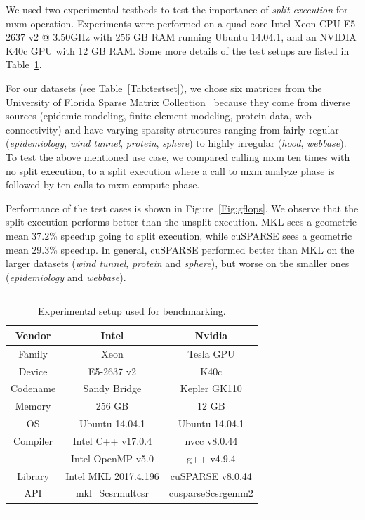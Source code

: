 We used two experimental testbeds to test the importance of \emph{split
execution} for {\sf mxm} operation. Experiments were performed on a
quad-core Intel Xeon CPU E5-2637 v2 @ 3.50GHz with 256 GB RAM running
Ubuntu 14.04.1, and an NVIDIA K40c GPU with 12 GB RAM. Some more details
of the test setups are listed in Table~\ref{Tab:testbed}.

For our datasets (see Table~\ref{Tab:testset}), we chose
six matrices from the University of Florida Sparse Matrix
Collection~\cite{davis2011university} because they come from diverse
sources (epidemic modeling, finite element modeling, protein data,
web connectivity) and have varying sparsity structures ranging from
fairly regular (\emph{epidemiology}, \emph{wind tunnel}, \emph{protein},
\emph{sphere}) to highly irregular (\emph{hood}, \emph{webbase}). To
test the above mentioned use case, we compared calling {\sf mxm} ten
times with no split execution, to a split execution where a call to {\sf
mxm} analyze phase is followed by ten calls to {\sf mxm} compute phase.

Performance of the test cases is shown in Figure~\ref{Fig:gflops}. We observe that the split
execution performs better than the unsplit execution. MKL sees a geometric mean
37.2\% speedup going to split execution, while cuSPARSE sees a geometric mean
29.3\% speedup. In general, cuSPARSE performed better than MKL on the
larger datasets (\emph{wind tunnel}, \emph{protein} and \emph{sphere}),
but worse on the smaller ones (\emph{epidemiology} and \emph{webbase}).

\begin{table}[htb]
	\hrule
	\caption{Experimental setup used for benchmarking.}
	\label{Tab:testbed}
	\begin{center}
		\begin{tabular}{|c|c|c|} \hline
			Vendor & Intel & Nvidia \\ \hline
			Family & Xeon & Tesla GPU \\
			Device & E5-2637 v2 & K40c \\
			Codename & Sandy Bridge & Kepler GK110 \\
			Memory & 256 GB & 12 GB \\
			OS & Ubuntu 14.04.1 & Ubuntu 14.04.1 \\
			Compiler & Intel C++ v17.0.4 & nvcc v8.0.44 \\
			& Intel OpenMP v5.0 & g++ v4.9.4 \\
			Library & Intel MKL 2017.4.196 & cuSPARSE v8.0.44 \\ 
			API & mkl\_Scsrmultcsr & cusparseScsrgemm2 \\ \hline
		\end{tabular}
	\end{center}
	\hrule
\end{table}

